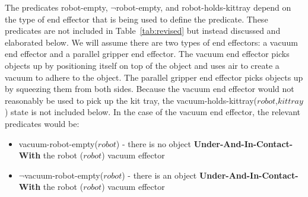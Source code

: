 \documentclass[preprint,12pt]{elsarticle}
\newcommand{\const}[1] {$\mathit{#1}$}
\newcommand{\stvar}[1] {\textsf{#1}}
\begin{document}
The predicates \stvar{robot-empty}, $\neg$\stvar{robot-empty}, and \stvar{robot-holds-kittray} depend on the type of end effector that is being used to define the predicate. These predicates are not included in Table~\ref{tab:revised} but instead discussed and elaborated below. We will assume there are two types of end effectors: a vacuum end effector and a parallel gripper end effector. The vacuum end effector picks objects up by positioning itself on top of the object and uses air to create a vacuum to adhere to the object. The parallel gripper end effector picks objects up by squeezing them from both sides.  Because the vacuum end effector would not reasonably be used to pick up the kit tray, the \stvar{vacuum-holds-kittray}(\const{robot},\const{kittray}) state is not included below. In the case of the vacuum end effector, the relevant predicates would be:


\begin{itemize}
\item \stvar{vacuum-robot-empty}(\const{robot}) - there is no object \textbf{Under-And-In-Contact-With} the robot (\const{robot}) vacuum effector
\item $\neg$\stvar{vacuum-robot-empty}(\const{robot}) - there is an object \textbf{Under-And-In-Contact-With} the robot (\const{robot}) vacuum effector
\end{itemize}
\end{document}
